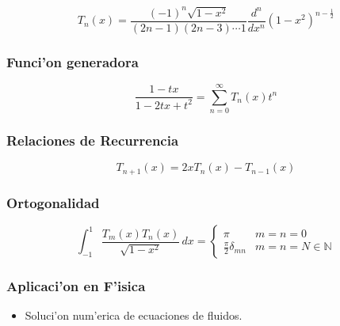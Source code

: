 \begin{equation}
T_{n}(x)=\frac{(-1)^{n}\sqrt{1-x^{2}}}{(2n-1)(2n-3)\cdots 1} \frac{d^{n}}{dx^{n}}(1-x^{2})^{n-\frac{1}{2}}
\end{equation}

\subsubsection{Funci'on generadora}

\begin{equation}
\frac{1-tx}{1-2tx+t^{2}}=\sum_{n=0}^{\infty}T_{n}(x)t^{n}
\end{equation}

\subsubsection{Relaciones de Recurrencia}

\begin{equation}
T_{n+1}(x)=2xT_{n}(x)-T_{n-1}(x)
\end{equation}

\subsubsection{Ortogonalidad}

\begin{equation}
\int_{-1}^{1}\frac{T_{m}(x)T_{n}(x)}{\sqrt{1-x^{2}}}\,dx= \left\{\begin{array}{ll}\pi & m=n=0\\ \frac{\pi}{2}\delta_{mn} & m=n=N \in \mathbb{N} \end{array}\right.
\end{equation}

\subsubsection{Aplicaci'on en F'isica}
\begin{itemize}
\item Soluci'on num'erica de ecuaciones de fluidos.
\end{itemize}